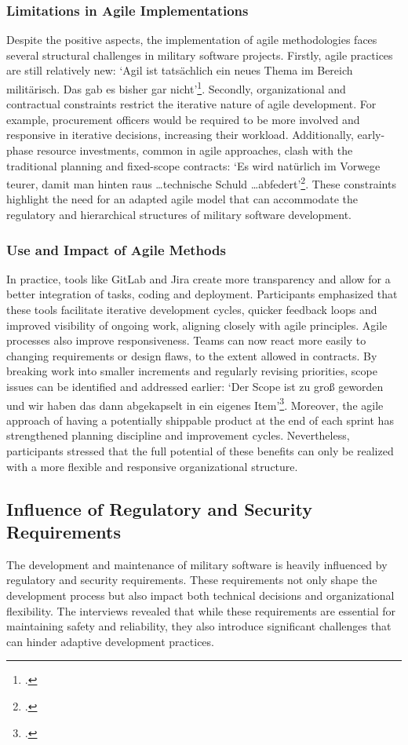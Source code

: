 \subsubsection{Limitations in Agile Implementations}
Despite the positive aspects, the implementation of agile methodologies faces several structural challenges in military software projects. Firstly, agile practices are still relatively new: `Agil ist tatsächlich ein neues Thema im Bereich militärisch. Das gab es bisher gar nicht'\footcite[62]{Interview12025}.
Secondly, organizational and contractual constraints restrict the iterative nature of agile development. For example, procurement officers would be required to be more involved and responsive in iterative decisions, increasing their workload. Additionally, early-phase resource investments, common in agile approaches,
clash with the traditional planning and fixed-scope contracts: `Es wird natürlich im Vorwege teurer, damit man hinten raus \ldots technische Schuld \ldots abfedert'\footcite[62]{Interview12025}. These constraints highlight the need for an adapted agile model that can accommodate the regulatory and hierarchical structures of military software development.

\subsubsection{Use and Impact of Agile Methods}
In practice, tools like GitLab and Jira create more transparency and allow for a better integration of tasks, coding and deployment. Participants emphasized that these tools facilitate iterative development cycles, quicker feedback loops and 
improved visibility of ongoing work, aligning closely with agile principles. 
Agile processes also improve responsiveness. Teams can now react more easily to changing requirements or design flaws, to the extent allowed in contracts. By breaking work into smaller increments and regularly revising priorities, scope issues can be identified and addressed earlier:
`Der Scope ist zu groß geworden und wir haben das dann abgekapselt in ein eigenes Item'\footcite[79]{Interview32025}. Moreover, the agile approach of having a potentially shippable product at the end of each sprint has strengthened planning discipline and improvement cycles.
Nevertheless, participants stressed that the full potential of these benefits can only be realized with a more flexible and responsive organizational structure.

\subsection{Influence of Regulatory and Security Requirements}
The development and maintenance of military software is heavily influenced by regulatory and security requirements. These requirements not only shape the development process but also impact both technical decisions and organizational flexibility.
The interviews revealed that while these requirements are essential for maintaining safety and reliability, they also introduce significant challenges that can hinder adaptive development practices.

